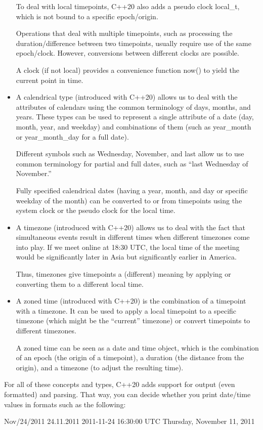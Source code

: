 \begin{itemize}
To deal with local timepoints, C++20 also adds a pseudo clock local\_t, which is not bound to a specific epoch/origin.

Operations that deal with multiple timepoints, such as processing the duration/difference between two timepoints, usually require use of the same epoch/clock. However, conversions between different clocks are possible.

A clock (if not local) provides a convenience function now() to yield the current point in time.

\item
A calendrical type (introduced with C++20) allows us to deal with the attributes of calendars using the common terminology of days, months, and years. These types can be used to represent a single attribute of a date (day, month, year, and weekday) and combinations of them (such as year\_month or year\_month\_day for a full date).

Different symbols such as Wednesday, November, and last allow us to use common terminology for partial and full dates, such as “last Wednesday of November.” 

Fully specified calendrical dates (having a year, month, and day or specific weekday of the month) can be converted to or from timepoints using the system clock or the pseudo clock for the local time.

\item
A timezone (introduced with C++20) allows us to deal with the fact that simultaneous events result in different times when different timezones come into play. If we meet online at 18:30 UTC, the local time of the meeting would be significantly later in Asia but significantly earlier in America.

Thus, timezones give timepoints a (different) meaning by applying or converting them to a different local time.

\item
A zoned time (introduced with C++20) is the combination of a timepoint with a timezone. It can be used to apply a local timepoint to a specific timezone (which might be the “current” timezone) or convert timepoints to different timezones.

A zoned time can be seen as a date and time object, which is the combination of an epoch (the origin of a timepoint), a duration (the distance from the origin), and a timezone (to adjust the resulting time).
\end{itemize}

For all of these concepts and types, C++20 adds support for output (even formatted) and parsing. That way, you can decide whether you print date/time values in formats such as the following:

\begin{shell}
Nov/24/2011
24.11.2011
2011-11-24 16:30:00 UTC
Thursday, November 11, 2011
\end{shell}